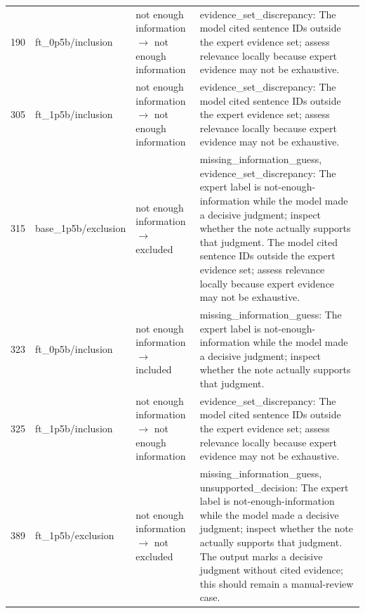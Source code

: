 \begin{table}[t]
\begin{tabularx}{\textwidth}{rllX}
190 & ft\_0p5b/inclusion & not enough information $\rightarrow$ not enough information & evidence\_set\_discrepancy: The model cited sentence IDs outside the expert evidence set; assess relevance locally because expert evidence may not be exhaustive. \\
305 & ft\_1p5b/inclusion & not enough information $\rightarrow$ not enough information & evidence\_set\_discrepancy: The model cited sentence IDs outside the expert evidence set; assess relevance locally because expert evidence may not be exhaustive. \\
315 & base\_1p5b/exclusion & not enough information $\rightarrow$ excluded & missing\_information\_guess, evidence\_set\_discrepancy: The expert label is not-enough-information while the model made a decisive judgment; inspect whether the note actually supports that judgment. The model cited sentence IDs outside the expert evidence set; assess relevance locally because expert evidence may not be exhaustive. \\
323 & ft\_0p5b/inclusion & not enough information $\rightarrow$ included & missing\_information\_guess: The expert label is not-enough-information while the model made a decisive judgment; inspect whether the note actually supports that judgment. \\
325 & ft\_1p5b/inclusion & not enough information $\rightarrow$ not enough information & evidence\_set\_discrepancy: The model cited sentence IDs outside the expert evidence set; assess relevance locally because expert evidence may not be exhaustive. \\
389 & ft\_1p5b/exclusion & not enough information $\rightarrow$ not excluded & missing\_information\_guess, unsupported\_decision: The expert label is not-enough-information while the model made a decisive judgment; inspect whether the note actually supports that judgment. The output marks a decisive judgment without cited evidence; this should remain a manual-review case. \\
\bottomrule
\end{tabularx}
\end{table}
